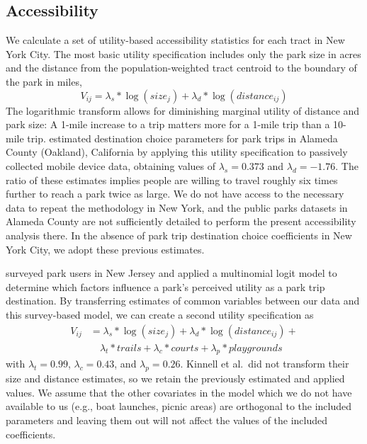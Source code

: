 \documentclass[Afour,sageh.bst]{sagej}
\begin{document}
\hypertarget{accessibility}{%
\subsection{Accessibility}\label{accessibility}}

\label{subsec:accessibility}

We calculate a set of utility-based accessibility statistics for each
tract in New York City. The most basic utility specification includes
only the park size in acres and the distance from the
population-weighted tract centroid to the boundary of the park in miles,
\begin{equation}\label{eq:u_access}
V_{ij} = \lambda_s * \log(size_j) + \lambda_d * \log(distance_{ij})
\end{equation} The logarithmic transform allows for diminishing marginal
utility of distance and park size: A 1-mile increase to a trip matters
more for a 1-mile trip than a 10-mile trip. \citet{Macfarlane2019}
estimated destination choice parameters for park trips in Alameda County
(Oakland), California by applying this utility specification to
passively collected mobile device data, obtaining values of
\(\lambda_s = 0.373\) and \(\lambda_d = -1.76\). The ratio of these
estimates implies people are willing to travel roughly six times further
to reach a park twice as large. We do not have access to the necessary
data to repeat the \citet{Macfarlane2019} methodology in New York, and
the public parks datasets in Alameda County are not sufficiently
detailed to perform the present accessibility analysis there. In the
absence of park trip destination choice coefficients in New York City,
we adopt these previous estimates.

\citet{Kinnell2006} surveyed park users in New Jersey and applied a
multinomial logit model to determine which factors influence a park's
perceived utility as a park trip destination. By transferring estimates
of common variables between our data and this survey-based model, we can
create a second utility specification as
\begin{equation}\label{eq:u_multi}
\begin{split}
V_{ij} & = \lambda_s * \log(size_j) + \lambda_d * \log(distance_{ij}) + \\ 
  & \quad \lambda_t * trails + \lambda_{c} * courts + \lambda_p * playgrounds
\end{split}
\end{equation} with \(\lambda_t = 0.99\), \(\lambda_c = 0.43\), and
\(\lambda_p = 0.26\). Kinnell et al.~did not transform their size and
distance estimates, so we retain the previously estimated and applied
values. We assume that the other covariates in the model which we do not
have available to us (e.g., boat launches, picnic areas) are orthogonal
to the included parameters and leaving them out will not affect the
values of the included coefficients.
\end{document}
